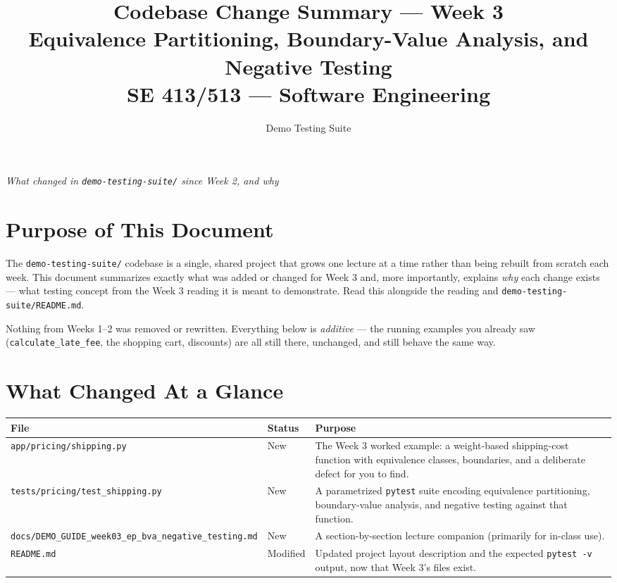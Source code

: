 \documentclass[11pt]{article}
\title{
  \textbf{Codebase Change Summary --- Week 3}\\[4pt]
  \large Equivalence Partitioning, Boundary-Value Analysis, and Negative Testing\\[2pt]
  \normalsize SE 413/513 --- Software Engineering
}
\author{Demo Testing Suite}
\date{}
\begin{document}
\maketitle

\begin{center}
\textit{What changed in \texttt{demo-testing-suite/} since Week 2, and why}
\end{center}

\vspace{0.3cm}

\section{Purpose of This Document}
The \texttt{demo-testing-suite/} codebase is a single, shared project that
grows one lecture at a time rather than being rebuilt from scratch each
week. This document summarizes exactly what was added or changed for
Week 3 and, more importantly, explains \emph{why} each change exists ---
what testing concept from the Week 3 reading it is meant to demonstrate.
Read this alongside the reading and \texttt{demo-testing-suite/README.md}.

\begin{keyidea}
Nothing from Weeks 1--2 was removed or rewritten. Everything below is
\emph{additive} --- the running examples you already saw
(\texttt{calculate\_late\_fee}, the shopping cart, discounts) are all
still there, unchanged, and still behave the same way.
\end{keyidea}

\section{What Changed At a Glance}
\begin{center}
\begin{tabular}{@{}p{5.4cm}p{1.6cm}p{7.4cm}@{}}
\toprule
\textbf{File} & \textbf{Status} & \textbf{Purpose} \\
\midrule
\texttt{app/pricing/shipping.py} & New & The Week 3 worked example: a
weight-based shipping-cost function with equivalence classes, boundaries,
and a deliberate defect for you to find. \\
\texttt{tests/pricing/test\_shipping.py} & New & A parametrized
\texttt{pytest} suite encoding equivalence partitioning, boundary-value
analysis, and negative testing against that function. \\
\texttt{docs/DEMO\_GUIDE\_week03\_ep\_bva\_negative\_testing.md} & New &
A section-by-section lecture companion (primarily for in-class use). \\
\texttt{README.md} & Modified & Updated project layout description and
the expected \texttt{pytest -v} output, now that Week 3's files exist. \\
\bottomrule
\end{tabular}
\end{center}
\end{document}
